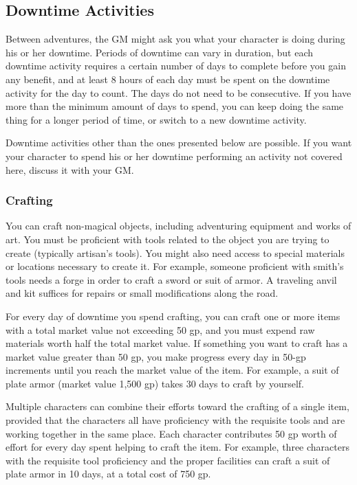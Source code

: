 \subsection{Downtime Activities}

Between adventures, the GM might ask you what your character is doing during his or her downtime. Periods of downtime can vary in duration, but each downtime activity requires a certain number of days to complete before you gain any benefit, and at least 8 hours of each day must be spent on the downtime activity for the day to count. The days do not need to be consecutive. If you have more than the minimum amount of days to spend, you can keep doing the same thing for a longer period of time, or switch to a new downtime activity.

Downtime activities other than the ones presented below are possible. If you want your character to spend his or her downtime performing an activity not covered here, discuss it with your GM.

\subsubsection{Crafting}

You can craft non-magical objects, including adventuring equipment and works of art. You must be proficient with tools related to the object you are trying to create (typically artisan's tools). You might also need access to special materials or locations necessary to create it. For example, someone proficient with smith's tools needs a forge in order to craft a sword or suit of armor. A traveling anvil and kit suffices for repairs or small modifications along the road.

For every day of downtime you spend crafting, you can craft one or more items with a total market value not exceeding 50 gp, and you must expend raw materials worth half the total market value. If something you want to craft has a market value greater than 50 gp, you make progress every day in 50-gp increments until you reach the market value of the item. For example, a suit of plate armor (market value 1,500 gp) takes 30 days to craft by yourself.

Multiple characters can combine their efforts toward the crafting of a single item, provided that the characters all have proficiency with the requisite tools and are working together in the same place. Each character contributes 50 gp worth of effort for every day spent helping to craft the item. For example, three characters with the requisite tool proficiency and the proper facilities can craft a suit of plate armor in 10 days, at a total cost of 750 gp.

